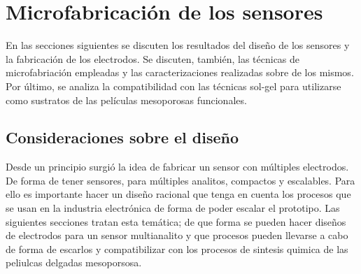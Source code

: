 
	
\section{Microfabricación de los sensores}
		
	 	 En las secciones siguientes se discuten los resultados del diseño de los sensores y la fabricación de los electrodos. Se discuten, también, las técnicas de microfabriación empleadas y las caracterizaciones realizadas sobre de los mismos. Por último, se analiza la compatibilidad con las técnicas sol-gel para utilizarse como sustratos de las películas mesoporosas funcionales.

  		\subsection{Consideraciones sobre el diseño}

			Desde un principio surgió la idea de fabricar un sensor con múltiples electrodos. De forma de tener sensores, para múltiples analitos, compactos y escalables. Para ello es importante hacer un diseño racional que tenga en cuenta los procesos que se usan en la industria electrónica de forma de poder escalar el prototipo. Las siguientes secciones tratan esta temática; de que forma se pueden hacer diseños de electrodos para un sensor multianalito y que procesos pueden llevarse a cabo de forma de escarlos y compatibilizar con los procesos de sintesis quimica de las peliulcas delgadas mesoporsosa.


